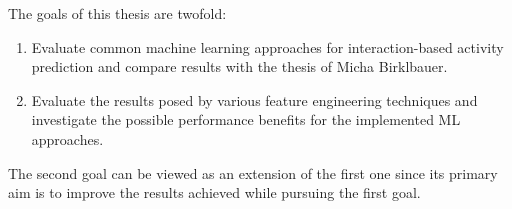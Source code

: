 The goals of this thesis are twofold: 
\begin{enumerate}
    \item Evaluate common machine learning approaches for interaction-based activity prediction 
    and compare results with the thesis of Micha Birklbauer\cite[]{Birklbauer2021}.
    \item Evaluate the results posed by various feature engineering techniques and 
    investigate the possible performance benefits for the implemented ML approaches. 
\end{enumerate}

The second goal can be viewed as an extension of the first one since its primary aim is to
improve the results achieved while pursuing the first goal.
